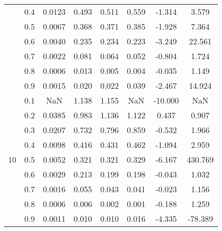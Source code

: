 \documentclass[11pt,a4paper]{report}
\begin{document}
\begin{longtable}{ | c | c || c | c | c | c | c | c | }
 & 0.4 & 0.0123 & 0.493 & 0.511 & 0.559 & -1.314 & 3.579 \\
 & 0.5 & 0.0067 & 0.368 & 0.371 & 0.385 & -1.928 & 7.364 \\
 & 0.6 & 0.0040 & 0.235 & 0.234 & 0.223 & -3.249 & 22.561 \\
 & 0.7 & 0.0022 & 0.081 & 0.064 & 0.052 & -0.804 & 1.724 \\
 & 0.8 & 0.0006 & 0.013 & 0.005 & 0.004 & -0.035 & 1.149 \\
 & 0.9 & 0.0015 & 0.020 & 0.022 & 0.039 & -2.467 & 14.924 \\
 \hline
\multirow{9}{*}{10} & 0.1 & NaN & 1.138 & 1.155 & NaN & -10.000 & NaN \\
 & 0.2 & 0.0385 & 0.983 & 1.136 & 1.122 & 0.437 & 0.907 \\
 & 0.3 & 0.0207 & 0.732 & 0.796 & 0.859 & -0.532 & 1.966 \\
 & 0.4 & 0.0098 & 0.416 & 0.431 & 0.462 & -1.094 & 2.959 \\
 & 0.5 & 0.0052 & 0.321 & 0.321 & 0.329 & -6.167 & 430.769 \\
 & 0.6 & 0.0029 & 0.213 & 0.199 & 0.198 & -0.043 & 1.032 \\
 & 0.7 & 0.0016 & 0.055 & 0.043 & 0.041 & -0.023 & 1.156 \\
 & 0.8 & 0.0006 & 0.006 & 0.002 & 0.001 & -0.188 & 1.259 \\
 & 0.9 & 0.0011 & 0.010 & 0.010 & 0.016 & -4.335 & -78.389 \\
 \hline
\hline
\end{longtable}
\end{document}
